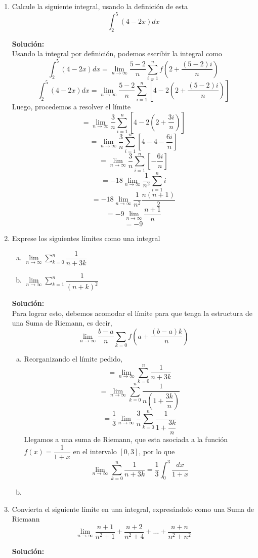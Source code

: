 \documentclass[12pt]{article}
\newenvironment{solucion}
{\begin{mdframed}[backgroundcolor=black!10]
		{\bf Solución:}\\
	}
	{
	\end{mdframed}
}
\newenvironment{preguntas}
{\begin{enumerate}\itemsep12pt
	}
	{
	\end{enumerate}
}
\newcommand{\ra}{\rightarrow}
\begin{document}
\begin{preguntas}
\item Calcule la siguiente integral, usando la definición de esta
	$$\int_2^5(4-2x)dx$$
\begin{solucion}
Usando la integral por definición, podemos escribir la integral como
		$$\int_2^5(4-2x)dx = \lim\limits_{n\ra \infty} \dfrac{5-2}{n} \sum\limits_{i=1}^n f \left(2+\dfrac{(5-2)i}{n}\right) $$
		$$\int_2^5(4-2x)dx = \lim\limits_{n\ra \infty} \dfrac{5-2}{n} \sum\limits_{i=1}^n \left[4-2 \left(2+\dfrac{(5-2)i}{n}\right)\right]$$
		Luego, procedemos a resolver el límite
		$$= \lim\limits_{n\ra \infty} \dfrac{3}{n} \sum\limits_{i=1}^n \left[4-2 \left(2+\dfrac{3i}{n}\right)\right]$$
		$$= \lim\limits_{n\ra \infty} \dfrac{3}{n} \sum\limits_{i=1}^n \left[4-4-\dfrac{6i}{n}\right]$$
		$$= \lim\limits_{n\ra \infty} \dfrac{3}{n} \sum\limits_{i=1}^n \left[-\dfrac{6i}{n}\right]$$
		$$= -18\lim\limits_{n\ra \infty} \dfrac{1}{n^2} \sum\limits_{i=1}^n i$$
		$$= -18\lim\limits_{n\ra \infty} \dfrac{1}{n^2} \dfrac{n(n+1)}{2}$$
		$$= -9\lim\limits_{n\ra \infty} \dfrac{n+1}{n}$$
		$$= -9$$
\end{solucion}
\item Exprese los siguientes límites como una integral
	
\begin{enumerate}[a)]
\item $\lim\limits_{n\ra \infty} \sum\limits_{k=0}^n \dfrac{1}{n+3k}$
\item $\lim\limits_{n\ra \infty} \sum\limits_{k=1}^n \dfrac{1}{(n+k)^2}$
\end{enumerate}
\begin{solucion}
Para lograr esto, debemos acomodar el límite para que tenga la estructura de una Suma de Riemann, es decir,
		$$\lim\limits_{n \ra \infty} \dfrac{b-a}{n}\sum\limits_{k=0} f\left(a+\dfrac{(b-a)k}{n}\right)$$
\begin{enumerate}[a)]
\item Reorganizando el límite pedido,
		$$ = \lim\limits_{n\ra \infty} \sum\limits_{k=0}^n \dfrac{1}{n+3k}$$
		$$ = \lim\limits_{n\ra \infty} \sum\limits_{k=0}^n \dfrac{1}{n\left(1+\dfrac{3k}{n}\right)}$$
		$$ = \dfrac{1}{3} \lim\limits_{n\ra \infty} \dfrac{3}{n} \sum\limits_{k=0}^n \dfrac{1}{1+\dfrac{3k}{n}}$$
		Llegamos a una suma de Riemann, que esta asociada a la función $f(x) = \dfrac{1}{1+x}$ en el intervalo $[0, 3]$, por lo que
		$$\lim\limits_{n\ra \infty} \sum\limits_{k=0}^n \dfrac{1}{n+3k} = \dfrac{1}{3} \displaystyle\int_0^3 \dfrac{dx}{1+x}$$
\item 
\end{enumerate}
\end{solucion}
\item Convierta el siguiente límite en una integral, expresándolo como una Suma de Riemann
$$\lim\limits_{n \ra \infty} \dfrac{n+1}{n^2+1} + \dfrac{n+2}{n^2+4} + \dots  + \dfrac{n+n}{n^2+n^2}$$
\begin{solucion}


\end{solucion}
\end{preguntas}
\end{document}
